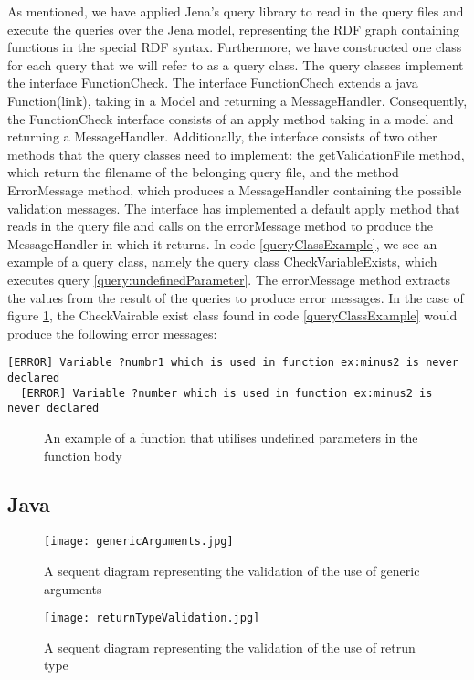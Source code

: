 \para
As mentioned, we have applied Jena's query library to read in the query files and execute the queries over the Jena model, representing the RDF graph containing functions in the special RDF syntax. Furthermore, we have constructed one class for each query that we will refer to as a query class. The query classes implement the interface FunctionCheck. The interface FunctionChech extends a java Function(link), taking in a Model and returning a MessageHandler. Consequently, the FunctionCheck interface consists of an apply method taking in a model and returning a MessageHandler. Additionally, the interface consists of two other methods that the query classes need to implement: the getValidationFile method, which return the filename of the belonging query file, and the method ErrorMessage method, which produces a MessageHandler containing the possible validation messages. The interface has implemented a default apply method that reads in the query file and calls on the errorMessage method to produce the MessageHandler in which it returns. In code \ref{queryClassExample}, we see an example of a query class, namely the query class CheckVariableExists, which executes query \ref{query:undefinedParameter}. The errorMessage method extracts the values from the result of the queries to produce error messages. In the case of figure \ref{fig:validation_erro_example}, the CheckVairable exist class found in  code \ref{queryClassExample} would produce the following error messages:  

\begin{lstlisting}[language=lutraMessages]
  [ERROR] Variable ?numbr1 which is used in function ex:minus2 is never declared 
  [ERROR] Variable ?number which is used in function ex:minus2 is never declared 
\end{lstlisting}

\begin{figure}[h]
  
  \caption{An example of a function that utilises undefined parameters in the function body}
  \label{fig:validation_erro_example}
\end{figure}

\subsection{Java}
\begin{figure}[h]
  \centering
  \texttt{[image: genericArguments.jpg]}
  \caption{A sequent diagram representing the validation of the use of generic arguments}
  \label{fig:genericArgumentsValidation}
\end{figure}
\begin{figure}[h]
  \centering
  \texttt{[image: returnTypeValidation.jpg]}
  \caption{A sequent diagram representing the validation of the use of retrun type}
  \label{fig:returnTypeValidation}
\end{figure}

